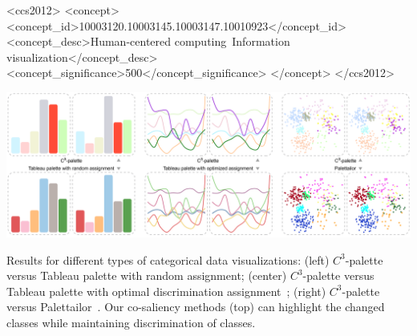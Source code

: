\documentclass[manuscript,review,anonymous]{acmart}
\begin{document}
\begin{CCSXML}
<ccs2012>
<concept>
<concept_id>10003120.10003145.10003147.10010923</concept_id>
<concept_desc>Human-centered computing~Information visualization</concept_desc>
<concept_significance>500</concept_significance>
</concept>
</ccs2012>
\end{CCSXML}



\begin{teaserfigure}
  \includegraphics[width=\textwidth]{teaser}
  \caption{
  Results for different types of categorical data visualizations: (left) $C^3$-palette versus Tableau palette with random assignment; (center) $C^3$-palette  versus
Tableau palette with optimal discrimination assignment~\cite{Wang2018}; (right) $C^3$-palette versus Palettailor~\cite{Lu21}. Our co-saliency methods (top) can highlight the changed classes while
maintaining discrimination of classes.}
  \label{fig:teaser}
\end{teaserfigure}

\maketitle





%



\end{document}
